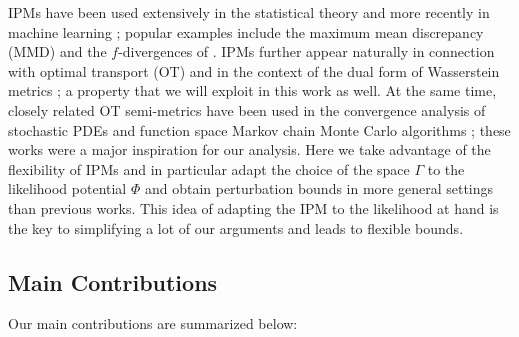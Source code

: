 \documentclass[final]{siamart171218}
\begin{document}
IPMs have been used extensively
in the statistical theory \cite{muller1997integral} 
and more  recently in  machine learning \cite{sriperumbudur2009integral, birrell2022f}; 
popular examples include the maximum 
mean discrepancy (MMD) \cite{muandet2017kernel, arbel2019maximum} and 
the $f$-divergences of \cite{nowozin2016f}.  
IPMs further appear  naturally in connection with optimal transport (OT) and 
in the context of the dual form of Wasserstein metrics \cite{villani-OT}; a property that 
we will exploit in this work as well.
At the same time, closely related
OT semi-metrics have been used in the
convergence analysis of stochastic PDEs and function space
Markov chain Monte Carlo algorithms
\cite{hairer2011asymptotic, hairer2014spectral, johndrow-approximation, hosseini-spectralgapARSD}; these 
works were a major inspiration for our analysis.
Here we take advantage of the flexibility of IPMs 
and in particular adapt the choice of the space $\Gamma$ 
to the likelihood  potential $\Phi$ and obtain perturbation 
bounds in more general settings than previous works. 
This idea of adapting the IPM to the likelihood at hand is the key to
simplifying a lot of our arguments and leads to 
flexible bounds.

\subsection{Main Contributions}\label{sec:main-contributions}

Our main contributions are summarized below: 

\end{document}
